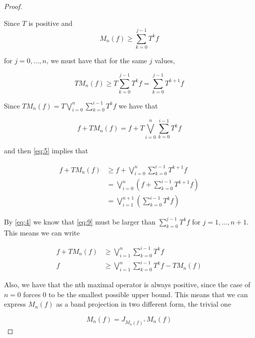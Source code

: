 \documentclass[letterpaper,10pt,oneside,onecolumn,reqno]{amsart}
\theoremstyle{definition}
\begin{document}
\begin{proof}\label{prf:max-erg}

  Since $T$ is positive and
  \begin{equation}
    \label{eq:4}
    M_n(f) \geq \sum\limits_{k=0}^{j-1} T^k f
  \end{equation}

  for $j = 0,\dots,n$, we must have that for the same $j$ values,

  \begin{equation}
    \label{eq:5}
    TM_n(f) \geq T\sum\limits_{k=0}^{j-1} T^k f = \sum\limits_{k=0}^{j-1} T^{k+1}f
  \end{equation}

  Since $TM_n(f) = T\bigvee_{i=0}^n\sum\limits_{k=0}^{i-1} T^k f$ we
  have that

  \begin{equation}
    \label{eq:6}
    f + TM_n(f) = f + T\bigvee_{i=0}^n\sum\limits_{k=0}^{i-1} T^k f 
  \end{equation}

  and then \eqref{eq:5} implies that

  \begin{align}
    \label{eq:7}
    f + TM_n(f) &\geq f + \bigvee_{i=0}^n\sum\limits_{k=0}^{i-1} T^{k+1}f  \\
    \label{eq:8}
    &= \bigvee_{i=0}^n( f + \sum\limits_{k=0}^{i-1} T^{k+1}f)  \\
    \label{eq:9}
    &= \bigvee_{i=1}^{n+1}( \sum\limits_{k=0}^{i-1} T^{k}f)
  \end{align}

  By \eqref{eq:4} we know that \eqref{eq:9} must be larger than
  $\sum\limits_{k=0}^{j-1} T^{k}f$ for $j = 1,\dots,n+1$. This means
  we can write

  \begin{align}
    \label{eq:10}
    f + TM_n(f) &\geq \bigvee_{i=1}^{n}\sum\limits_{k=0}^{i-1} T^{k}f  \\
    \label{eq:11}
    f &\geq \bigvee_{i=1}^{n}\sum\limits_{k=0}^{i-1} T^{k}f - TM_n(f)
  \end{align}


  Also, we have that the nth maximal operator is always positive,
  since the case of $n=0$ forces $0$ to be the smallest possible upper
  bound. This means that we can express $M_n(f)$ as a band projection
  in two different form, the trivial one

  \begin{equation}
    \label{eq:12}
    M_n(f) = J_{M_n{(f)}^+}M_n(f) 
  \end{equation}


\end{proof}
\end{document}
